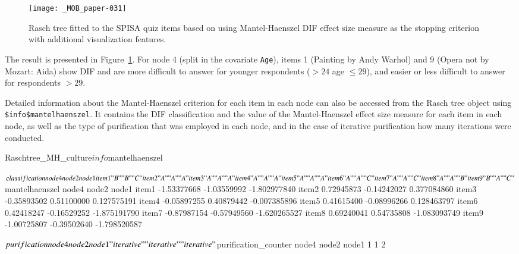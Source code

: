 \documentclass[doc,floatsintext,natbib]{apa7}
\begin{document}
\begin{figure}%
\caption{Rasch tree fitted to the SPISA quiz items based on using Mantel-Haenszel DIF effect size measure as the stopping criterion with additional visualization features.}
\texttt{[image: \_MOB\_paper-031]}
\label{fig:MHtree4}
\end{figure}%

The result is presented in Figure~\ref{fig:MHtree4}. For node 4 (split in the covariate \texttt{Age}), items 1 (Painting by Andy Warhol) and 9 (Opera not by Mozart: Aida) show DIF and are %
more difficult to answer for younger respondents ($>24$ age $\leq 29$), and easier or less difficult to answer for respondents $>29$.

Detailed information about the Mantel-Haenszel criterion for each item in each node can also be accessed from the Rasch tree object using \texttt{\$info\$mantelhaenszel}. It contains the DIF classification and the value of the Mantel-Haenszel effect size measure for each item in each node, as well as the type of purification that was employed in each node, and in the case of iterative purification how many iterations were conducted.

\begin{Schunk}
\begin{Sinput}
 Raschtree_MH_culture$info$mantelhaenszel
\end{Sinput}
\begin{Soutput}
$classification
      node4 node2 node1
item1 "B"   "B"   "C"  
item2 "A"   "A"   "A"  
item3 "A"   "A"   "A"  
item4 "A"   "A"   "A"  
item5 "A"   "A"   "A"  
item6 "A"   "A"   "C"  
item7 "A"   "A"   "C"  
item8 "A"   "A"   "B"  
item9 "B"   "A"   "C"  

$mantelhaenszel
            node4       node2        node1
item1 -1.53377668 -1.03559992 -1.802977840
item2  0.72945873 -0.14242027  0.377084860
item3 -0.35893502  0.51100000  0.127575191
item4 -0.05897255  0.40879442 -0.007385896
item5  0.41615400 -0.08996266  0.128463797
item6  0.42418247 -0.16529252 -1.875191790
item7 -0.87987154 -0.57949560 -1.620265527
item8  0.69240041  0.54735808 -1.083093749
item9 -1.00725807 -0.39502640 -1.798520587

$purification
      node4       node2       node1 
"iterative" "iterative" "iterative" 

$purification_counter
node4 node2 node1 
    1     1     2 
\end{Soutput}
\end{Schunk}
\end{document}
